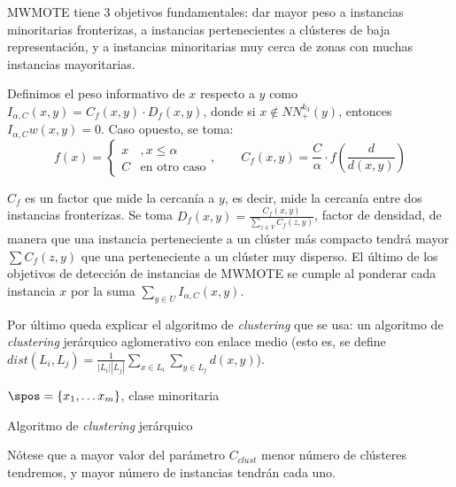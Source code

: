 MWMOTE tiene 3 objetivos fundamentales: dar mayor peso a instancias minoritarias fronterizas, a instancias pertenecientes
a clústeres de baja representación, y a instancias minoritarias muy cerca de zonas con muchas instancias mayoritarias.

Definimos el peso informativo de $x$ respecto a $y$ como $I_{\alpha,C}(x,y) = C_f(x,y) \cdot D_f(x,y)$, donde si 
$x \notin NN_{+}^{k_3}(y)$, entonces $I_{\alpha,C}w(x,y) = 0$. Caso opuesto, se toma:
\[
  f(x) = \left\{\begin{array}{ll} 
                x &, x\le \alpha \\
                C & \textrm{en otro caso}
               \end{array}\right.,\qquad C_f(x,y) = \frac{C}{\alpha} \cdot f\left(\frac{d}{d(x,y)}\right)
\]

$C_f$ es un factor que mide la cercanía a $y$, es decir, mide la cercanía entre dos instancias fronterizas. Se toma 
$D_f(x,y) = \frac{C_f(x,y)}{\sum_{z\in V} C_f(z,y)}$, factor de densidad, de manera que una instancia perteneciente
a un clúster más compacto tendrá mayor $\sum C_f(z,y)$ que una perteneciente a un clúster muy disperso. El último de los
objetivos de detección de instancias de MWMOTE se cumple al ponderar cada instancia $x$ por la suma 
$\sum_{y\in U} I_{\alpha, C}(x,y)$.

Por último queda explicar el algoritmo de \textit{clustering} que se usa: un algoritmo de \textit{clustering} jerárquico
aglomerativo con enlace medio (esto es, se define $dist(L_i, L_j) = \frac{1}{|L_i||L_j|} \sum_{x\in L_i} \sum_{y\in L_j} d(x,y)$).


\begin{algorithm}[H]
\begin{algorithmic}[1]
  \REQUIRE $\spos = \{x_1, \ldots x_m\}$, clase minoritaria
  \ENDWHILE
\end{algorithmic}
\caption{Algoritmo de \textit{clustering} jerárquico}
\label{alg:hclust}
\end{algorithm}

Nótese que a mayor valor del parámetro $C_{clust}$ menor número de clústeres tendremos, y mayor número de instancias tendrán
cada uno.
